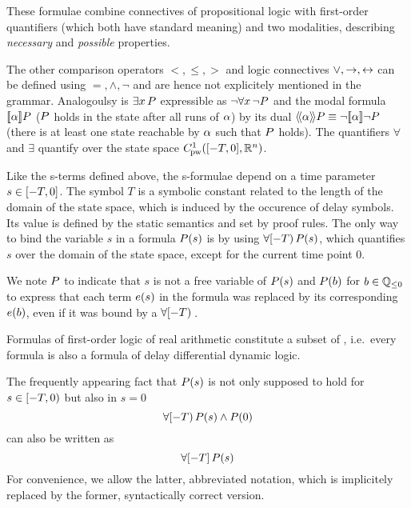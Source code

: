     These formulae combine connectives of propositional logic with first-order quantifiers (which both have standard meaning) and two modalities, describing \emph{necessary} and \emph{possible} properties.

    The other comparison operators $<,\leq,>$ and logic connectives $\lor,\rightarrow,\leftrightarrow$ can be defined using $=,\land,\lnot$ and are hence not explicitely mentioned in the grammar.
    Analogoulsy is $\exists x{\,} P$ expressible as $\lnot\forall x{\,} \lnot P$ and the modal formula $\dbox{\asprg}{\asfml}$ ($P$ holds in the state after all runs of $\alpha$) by its dual $\ddiamond{\asprg}{\asfml}\equiv\lnot\dbox{\asprg}{\lnot\asfml}$ (there is at least one state reachable by $\alpha$ such that $P$ holds).
    The quantifiers $\forall$ and $\exists$ quantify over the state space $\statespace$.

    Like the s-terms defined above, the s-formulae depend on a time parameter $s\in[-T,0]$. The symbol $T$ is a symbolic constant related to the length of the domain of the state space, which is induced by the occurence of delay symbols. Its value is defined by the static semantics and set by proof rules.
    The only way to bind the variable $s$ in a formula $P(s)$ is by using $\forall [-T){\,} P(s)$, which quantifies $s$ over the domain of the state space, except for the current time point $0$.

    We note $P$ to indicate that $s$ is not a free variable of $P(s)$ and $P(b)$ for $b\in\mathbb{Q}_{\leq 0}$ to express that each term $e(s)$ in the formula was replaced by its corresponding $e(b)$, even if it was bound by a $\forall [-T){\,}$.
    
    Formulas of first-order logic of real arithmetic constitute a subset of \ddL, i.e.\ every \FOLR formula is also a formula of delay differential dynamic logic.

    \begin{convention}
        The frequently appearing fact that $P(s)$ is not only supposed to hold for $s\in[-T,0)$ but also in $s=0$
        \begin{equation*}
            \forall [-T){\,} P(s)\land P(0)
        \end{equation*}
        can also be written as
        \begin{equation*}
            \forall [-T]{\,} P(s)
        \end{equation*}
        For convenience, we allow the latter, abbreviated notation, which is implicitely replaced by the former, syntactically correct version.
    \end{convention}

